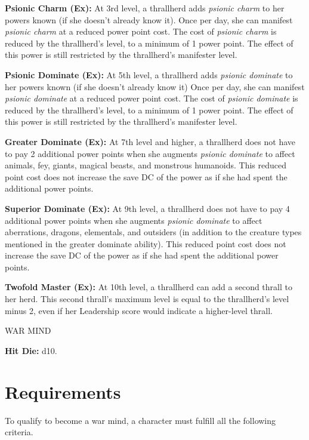 \documentclass{article}
\begin{document}
\vspace{12pt}
\textbf{Psionic Charm (Ex):} At 3rd level, a thrallherd adds \textit{psionic charm 
}to her powers known (if she doesn't already know it). Once per day, she can manifest 
\textit{psionic charm }at a reduced power point cost. The cost of \textit{psionic 
charm }is reduced by the thrallherd's level, to a minimum of 1 power point. The 
effect of this power is still restricted by the thrallherd's manifester level.

\textbf{Psionic Dominate (Ex):} At 5th level, a thrallherd adds \textit{psionic 
dominate }to her powers known (if she doesn't already know it) Once per day, she 
can manifest \textit{psionic dominate }at a reduced power point cost. The cost 
of \textit{psionic dominate }is reduced by the thrallherd's level, to a minimum 
of 1 power point. The effect of this power is still restricted by the thrallherd's 
manifester level.

\textbf{Greater Dominate (Ex):} At 7th level and higher, a thrallherd does not 
have to pay 2 additional power points when she augments \textit{psionic dominate 
}to affect animals, fey, giants, magical beasts, and monstrous humanoids. This 
reduced point cost does not increase the save DC of the power as if she had spent 
the additional power points.

\textbf{Superior Dominate (Ex): }At 9th level, a thrallherd does not have to pay 
4 additional power points when she augments \textit{psionic dominate }to affect 
aberrations, dragons, elementals, and outsiders (in addition to the creature types 
mentioned in the greater dominate ability). This reduced point cost does not increase 
the save DC of the power as if she had spent the additional power points.

\textbf{Twofold Master (Ex):} At 10th level, a thrallherd can add a second thrall 
to her herd. This second thrall's maximum level is equal to the thrallherd's level 
minus 2, even if her Leadership score would indicate a higher-level thrall.

\vspace{12pt}
{\LARGE{}WAR MIND}

\textbf{Hit Die:} d10.

\vspace{12pt}
\section*{\textbf{Requirements}}

To qualify to become a war mind, a character must fulfill all the following criteria.
\end{document}
